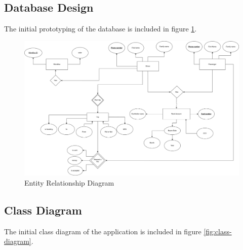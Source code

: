 \documentclass{BusMateSRS}
\begin{document}
\subsection{Database Design}

The initial prototyping of the database is included in figure 
\ref{fig:entity-relationship-diagram}.

\begin{figure}[h!]
  \begin{center}
    \includegraphics[width=\columnwidth]{drawings/entity-relationship-diagram.drawio.png}
  \end{center}
  \caption{Entity Relationship Diagram}
  \label{fig:entity-relationship-diagram}
\end{figure}

\subsection{Class Diagram}
The initial class diagram of the application is included in figure 
\ref{fig:class-diagram}.
\end{document}
